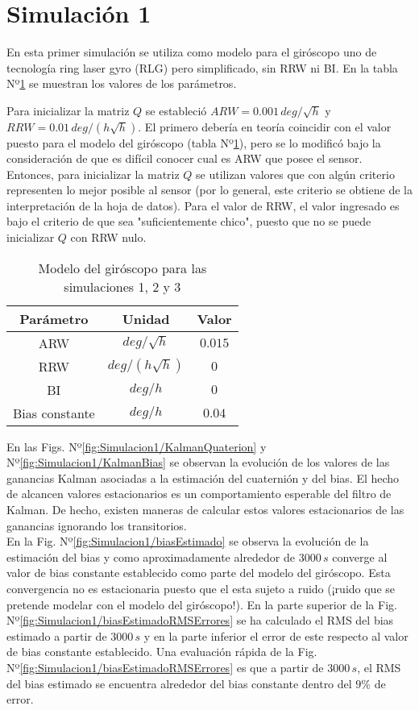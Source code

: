 \documentclass[a4paper,11pt,twoside]{IT-CNEA}
\begin{document}
\section{Simulación 1}
En esta primer simulación se utiliza como modelo para el giróscopo uno de tecnología ring laser gyro (RLG) pero simplificado, sin RRW ni BI. En la tabla Nº\ref{tabla:modeloGyroRLGSimulaciones123} se muestran los valores de los parámetros. 
\par Para inicializar la matriz $Q$ se estableció $ARW=0.001\,deg/\sqrt{h}$ y $RRW=0.01\,deg/\left( h\sqrt{h}\right)$. El primero debería en teoría coincidir con el valor puesto para el modelo del giróscopo (tabla Nº\ref{tabla:modeloGyroRLGSimulaciones123}), pero se lo modificó bajo la consideración de que es difícil conocer cual es ARW que posee el sensor. Entonces, para inicializar la matriz $Q$ se utilizan valores que con algún criterio representen lo mejor posible al sensor (por lo general, este criterio se obtiene de la interpretación de la hoja de datos). Para el valor de RRW, el valor ingresado es bajo el criterio de que sea "suficientemente chico", puesto que no se puede inicializar $Q$ con RRW nulo.
\begin{table}[h!]
\centering
\caption{Modelo del giróscopo para las simulaciones 1, 2 y 3}
\label{tabla:modeloGyroRLGSimulaciones123}
\begin{tabular}{|c|c|c|}
\hline
Parámetro & Unidad& Valor\\ \hline
ARW&$deg/\sqrt{h}$&$0.015$ \\ \hline
RRW&$deg/\left(h\sqrt{h}\right)$&$0$ \\ \hline
BI&$deg/h$&$0$ \\ \hline
Bias constante&$deg/h$&$0.04$ \\ \hline
\end{tabular}
\end{table} 
\par En las Figs. Nº\ref{fig:Simulacion1/KalmanQuaterion} y Nº\ref{fig:Simulacion1/KalmanBias} se observan la evolución de los valores de las ganancias Kalman asociadas a la estimación del cuaternión y del bias. El hecho de alcancen valores estacionarios es un comportamiento esperable del filtro de Kalman. De hecho, existen maneras de calcular estos valores estacionarios de las ganancias ignorando los transitorios. 
\\ En la Fig. Nº\ref{fig:Simulacion1/biasEstimado} se observa la evolución de la estimación del bias y como aproximadamente alrededor de $3000\,s$ converge al valor de bias constante establecido como parte del modelo del giróscopo. Esta convergencia no es estacionaria puesto que el esta sujeto a ruido (¡ruido que se pretende modelar con el modelo del giróscopo!). En la parte superior de la Fig. Nº\ref{fig:Simulacion1/biasEstimadoRMSErrores} se ha calculado el RMS del bias estimado a partir de $3000\,s$ y en la parte inferior el error de este respecto al valor de bias constante establecido. Una evaluación rápida de la Fig. Nº\ref{fig:Simulacion1/biasEstimadoRMSErrores} es que a partir de $3000\,s$, el RMS del bias estimado se encuentra alrededor del bias constante dentro del $9\%$ de error. 
\end{document}
